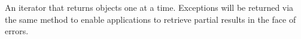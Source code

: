 An iterator that returns objects one at a time.  Exceptions will be returned via
the same method to enable applications to retrieve partial results in the face
of errors.
